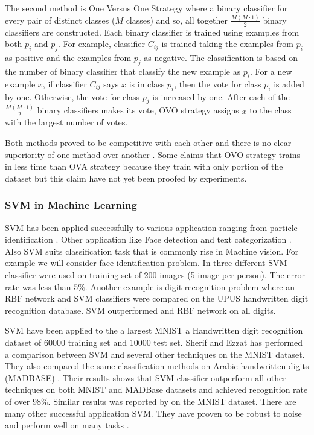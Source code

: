  The second method is One Versus One Strategy where a binary classifier for every pair of distinct classes ($M$ classes) and so, all together $\frac{M(M \cdot 1)}{2}$ binary classifiers are constructed. Each binary classifier is trained using examples from both $p_i$ and $p_j$. For example, classifier $C_{ij}$ is trained taking the examples from $p_i$ as positive and the examples from $p_j$ as negative. The classification is based on the number of binary classifier that classify the new example as $p_i$. For a new example $x$, if classifier $C_{ij}$ says $x$ is in class $p_i$, then the vote for class $p_i$ is added by one. Otherwise, the vote for class $p_j$ is increased by one. After each of the $\frac{M(M \cdot 1)}{2}$  binary classifiers makes its vote,  OVO strategy assigns $x$ to the class with the largest number of votes. 
 
 Both methods proved to be competitive with each other and there is no clear superiority of one method
over another \cite{Duan05whichis}. Some claims that OVO strategy trains in less time than OVA strategy because they train with only portion of the dataset \cite{libsvm} but this claim have not yet been proofed by experiments.  


\subsubsection{ SVM in Machine Learning }
SVM has been applied successfully to various application ranging from particle identification \cite{ParticleSVM7}. Other application like Face detection \cite{faceSVM8,faceSVM7} and text categorization \cite{TextSVM7}. Also SVM suits classification task that is commonly rise in Machine vision. For example we will consider face identification\cite{faceSVM8} problem. In \cite{faceSVM8} three different SVM classifier were used on training set of 200 images (5 image per person). The error rate was less than 5\%. Another example is digit recognition problem where an RBF network and SVM classifiers were compared on the UPUS handwritten digit recognition database\cite{ORLDataset}.  SVM outperformed and RBF network on all digits.  


SVM have been applied to the a largest MNIST a Handwritten digit recognition dataset of 60000 training set and 10000 test set\cite{IjdarSherifPaper}. Sherif and Ezzat has performed a comparison between SVM and several other techniques on the MNIST dataset. They also compared the same classification methods on Arabic handwritten digits (MADBASE) \cite{ADBase9,IjdarSherifPaper}. Their results shows that SVM classifier outperform all other techniques on both MNIST and MADBase datasets and achieved recognition rate of over 98\%. Similar results was reported by \cite{empiricalcomp11,SVMInvariantComDecoste02} on the MNIST dataset. There are many other successful application SVM. They have proven to be robust to noise and perform well on many tasks \cite{empiricalcomp11,Scholkopf97comparingsupport}. 


